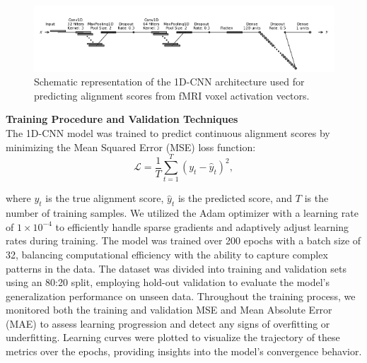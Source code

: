 \documentclass[a4paper]{article}
\begin{document}
\begin{figure}
    \centering
    \includegraphics[width=1\linewidth]{CNNArch2.png}
    \caption{Schematic representation of the 1D-CNN architecture used for predicting alignment scores from fMRI voxel activation vectors.}
    \label{fig:1dCNNarch}
\end{figure}

\noindent \textbf{Training Procedure and Validation Techniques}\\
The 1D-CNN model was trained to predict continuous alignment scores by minimizing the Mean Squared Error (MSE) loss function:
\begin{equation}
\mathcal{L} = \frac{1}{T} \sum_{t=1}^{T} \left( y_t - \hat{y}_t \right)^2,
\end{equation}


\noindent where \( y_t \) is the true alignment score, \( \hat{y}_t \) is the predicted score, and \( T \) is the number of training samples. We utilized the Adam optimizer with a learning rate of \( 1 \times 10^{-4} \) to efficiently handle sparse gradients and adaptively adjust learning rates during training. The model was trained over 200 epochs with a batch size of 32, balancing computational efficiency with the ability to capture complex patterns in the data. The dataset was divided into training and validation sets using an 80:20 split, employing hold-out validation to evaluate the model's generalization performance on unseen data. Throughout the training process, we monitored both the training and validation MSE and Mean Absolute Error (MAE) to assess learning progression and detect any signs of overfitting or underfitting. Learning curves were plotted to visualize the trajectory of these metrics over the epochs, providing insights into the model's convergence behavior.
\end{document}
